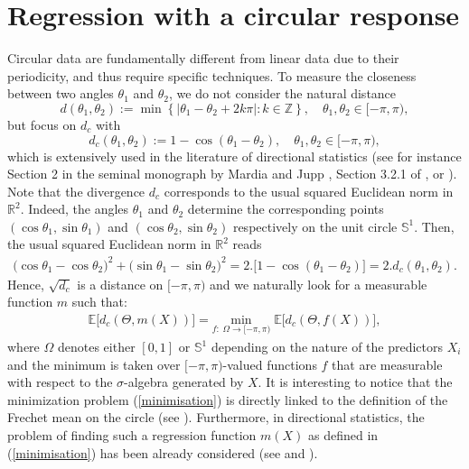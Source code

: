 \documentclass[11pt,a4paper,openany]{article}
\def\R{\mathbb{R}}
\begin{document}
\section{Regression with a circular response}\label{sec:framework}
Circular data are fundamentally different from linear data due to their periodicity, and thus require specific techniques.  To measure the closeness between two angles $\theta_1$ and $\theta_2$, we do not consider the natural distance
$$d(\theta_{1} , \theta_{2}) := \min \left\{ \big| \theta_{1}  - \theta_{2}  +  2k\pi \big| : k \in \mathbb{Z} \right\},\quad \theta_1, \theta_2 \in [-\pi, \pi),$$
but focus on $d_c$ with $$d_{c} (\theta_{1}, \theta_{2}) := 1 - \cos(\theta_{1} - \theta_{2}),\quad \theta_1, \theta_2 \in [-\pi, \pi),$$   which is extensively used in the literature of directional statistics (see for instance Section 2 in the seminal monograph by Mardia and Jupp \cite{book:Mardia-Jupp}, Section 3.2.1 of \cite{book:Ley-Verdebout}, \cite{Marzio-Panzera-Taylor} or \cite{MVila-FFernandez-Crujeiras-Panzera}). Note that the divergence $d_c$ corresponds to the usual squared Euclidean norm in $\R^{2}$. Indeed, the angles $\theta_{1}$ and $\theta_{2}$ determine the corresponding points $( \cos \theta_{1} ,  \sin \theta_{1})$ and $( \cos \theta_{2} ,  \sin \theta_{2})$ respectively on the unit circle $\mathbb{S}^{1}$.  Then, the usual squared Euclidean norm  in $\R^{2}$ reads
\begin{align*}
\big( \cos \theta_{1} - \cos \theta_{2} \big)^{2} + \big( \sin \theta_{1} - \sin \theta_{2} \big)^{2} = 2. \big[ 1 - \cos (\theta_{1} - \theta_{2}) \big] = 2. d_{c}(\theta_{1}, \theta_{2}).
\end{align*}
Hence, $\sqrt{d_c}$ is a distance on $[-\pi,\pi)$ and we naturally look for a measurable function $m$ such that: 
\begin{align}\label{minimisation}
\mathbb{E} \big[ d_c(\Theta, m(X))  \big] =
\underset{f: \; \Omega \rightarrow [-\pi,\pi) }{ \textrm{min} } \; \mathbb{E} \big[ d_c(\Theta, f(X))  \big],
\end{align}
where $\Omega$ denotes either $[0,1]$ or $\mathbb{S}^1$ depending on the nature of the predictors $X_i$ and the minimum is taken over $[-\pi, \pi)$-valued functions $f$ that are measurable with respect to the $\sigma$-algebra generated by $X$. It is interesting to notice that the minimization problem (\ref{minimisation}) is directly linked to the definition of the Frechet mean on the circle (see \cite{Charlier:2013}). 
Furthermore, in directional statistics, the problem of finding such a regression function $m(X)$ as defined in (\ref{minimisation}) has been already considered (see \cite{Nguyen-PhamNgoc-Rivoirard} and \cite{MVila-FFernandez-Crujeiras-Panzera}).
\end{document}
